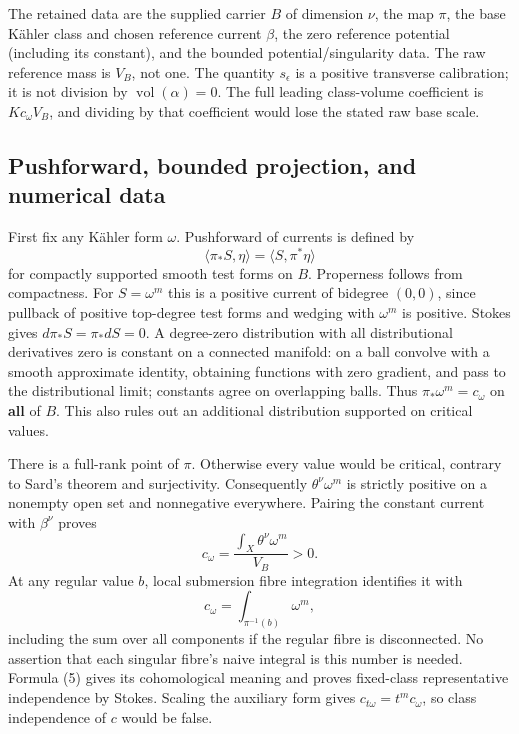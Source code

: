 \documentclass[
  11pt,
]{article}
\begin{document}
The retained data are the supplied carrier \(B\) of dimension \(\nu\),
the map \(\pi\), the base Kähler class and chosen reference current
\(\beta\), the zero reference potential (including its constant), and
the bounded potential/singularity data. The raw reference mass is
\(V_B\), not one. The quantity \(s_\epsilon\) is a positive transverse
calibration; it is not division by \(\operatorname{vol}(\alpha)=0\). The
full leading class-volume coefficient is \(Kc_{\omega}V_B\), and
dividing by that coefficient would lose the stated raw base scale.

\subsection{Pushforward, bounded projection, and numerical
data}\label{pushforward-bounded-projection-and-numerical-data}

First fix any Kähler form \(\omega\). Pushforward of currents is defined
by \[\langle\pi_*S,\eta\rangle=\langle S,\pi^*\eta\rangle\] for
compactly supported smooth test forms on \(B\). Properness follows from
compactness. For \(S=\omega^m\) this is a positive current of bidegree
\((0,0)\), since pullback of positive top-degree test forms and wedging
with \(\omega^m\) is positive. Stokes gives \(d\pi_*S=\pi_*dS=0\). A
degree-zero distribution with all distributional derivatives zero is
constant on a connected manifold: on a ball convolve with a smooth
approximate identity, obtaining functions with zero gradient, and pass
to the distributional limit; constants agree on overlapping balls. Thus
\(\pi_*\omega^m=c_\omega\) on \textbf{all} of \(B\). This also rules out
an additional distribution supported on critical values.

There is a full-rank point of \(\pi\). Otherwise every value would be
critical, contrary to Sard's theorem and surjectivity. Consequently
\(\theta^\nu\omega^m\) is strictly positive on a nonempty open set and
nonnegative everywhere. Pairing the constant current with \(\beta^\nu\)
proves \[c_\omega=\frac{\int_X\theta^\nu\omega^m}{V_B}>0. \tag{5}\] At
any regular value \(b\), local submersion fibre integration identifies
it with \[c_\omega=\int_{\pi^{-1}(b)}\omega^m,\] including the sum over
all components if the regular fibre is disconnected. No assertion that
each singular fibre's naive integral is this number is needed. Formula
(5) gives its cohomological meaning and proves fixed-class
representative independence by Stokes. Scaling the auxiliary form gives
\(c_{t\omega}=t^m c_\omega\), so class independence of \(c\) would be
false.
\end{document}
